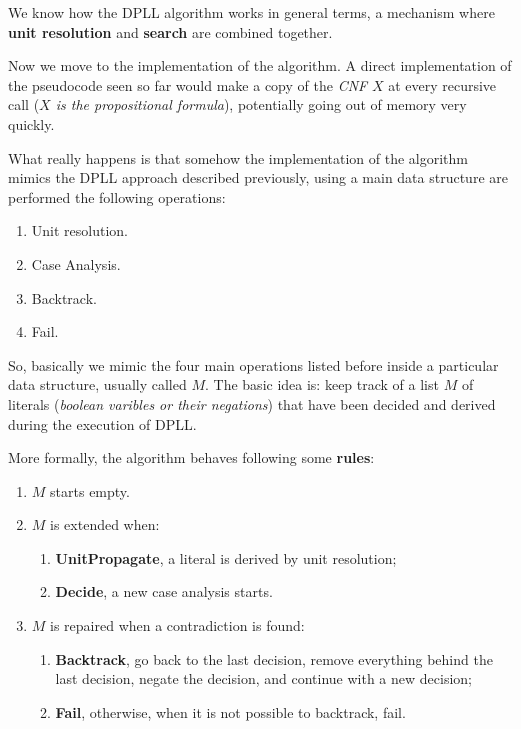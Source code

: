 We know how the DPLL algorithm works in general terms, a mechanism where \textbf{unit resolution} and \textbf{search} are combined together. \vspace{7pt}

Now we move to the implementation of the algorithm. A direct implementation of the pseudocode seen so far would make a copy of the \textit{CNF} $X$ at every
recursive call (\textit{$X$ is the propositional formula}), potentially going out of memory very quickly. \vspace{7pt}

What really happens is that somehow the implementation of the algorithm mimics the DPLL approach described previously, using a main data structure are performed 
the following operations:
\begin{enumerate}
    \item Unit resolution.
    \item Case Analysis.
    \item Backtrack.
    \item Fail.
\end{enumerate} \vspace{7pt}

So, basically we mimic the four main operations listed before inside a particular data structure, usually called $M$. The basic idea is: keep track of a list $M$
of literals (\textit{boolean varibles or their negations}) that have been decided and derived during the execution of DPLL.

More formally, the algorithm behaves following some \textbf{rules}:
\begin{enumerate}
    \item $M$ starts empty.
    \item $M$ is extended when:
    \begin{enumerate}
        \item \textbf{UnitPropagate}, a literal is derived by unit resolution;
        \item \textbf{Decide}, a new case analysis starts.
    \end{enumerate}
    \item $M$ is repaired when a contradiction is found:
    \begin{enumerate}
        \item \textbf{Backtrack}, go back to the last decision, remove everything behind the last decision, negate the decision, and continue with a new decision;
        \item \textbf{Fail}, otherwise, when it is not possible to backtrack, fail.
    \end{enumerate}
\end{enumerate}

